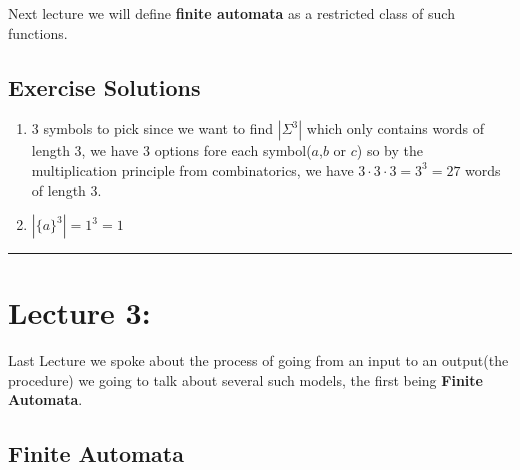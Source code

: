 \documentclass{article}
\begin{document}
Next lecture we will define \textbf{finite automata} as a restricted class of such functions.

\subsection*{Exercise Solutions}
\begin{enumerate}
    \item 3 symbols to pick since we want to find $|\Sigma^3|$ which only contains words of length 3, we have 3 options fore each symbol($a$,$b$ or $c$) so by the multiplication principle from combinatorics, we have $3\cdot3\cdot3=3^3=27$ words of length 3.
    \item $|\{a\}^3|=1^3=1$
\end{enumerate}

\begin{center}
	\rule{450pt}{1pt} 
\end{center}
\newpage

\section*{Lecture 3:}
Last Lecture we spoke about the process of going from an input to an output(the procedure) we going to talk about several such models, the first being \textbf{Finite Automata}.

\subsection*{Finite Automata}
\end{document}
